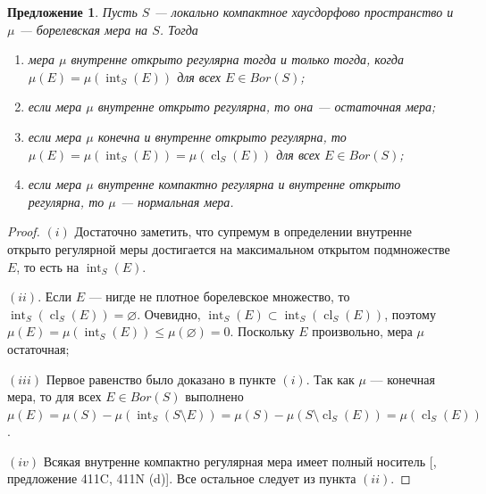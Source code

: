 \documentclass[12pt]{article}
\newtheorem{proposition}[theorem]{Предложение}
\begin{document}
\begin{proposition}\label{InnerOpenRegMeasCharac} Пусть $S$ --- локально
    компактное хаусдорфово пространство и $\mu$ --- борелевская мера на $S$.
    Тогда

    \begin{enumerate}[label = (\roman*)]
        \item мера $\mu$ внутренне открыто регулярна тогда и только тогда, когда
              $\mu(E)=\mu(\operatorname{int}_S(E))$ для всех $E\in Bor(S)$;

        \item если мера $\mu$ внутренне открыто регулярна, то она 
              --- остаточная мера;

        \item если мера $\mu$ конечна и внутренне открыто регулярна, то
              $\mu(E)=\mu(\operatorname{int}_S(E))=\mu(\operatorname{cl}_S(E))$
              для всех $E\in Bor(S)$;

        \item если мера $\mu$ внутренне компактно регулярна и внутренне открыто 
              регулярна, то $\mu$ --- нормальная мера.
    \end{enumerate}
\end{proposition}
\begin{proof} $(i)$ Достаточно заметить, что супремум в определении внутренне
    открыто регулярной меры достигается на максимальном открытом подмножестве
    $E$, то есть на $\operatorname{int}_S(E)$.

    $(ii)$. Если $E$ --- нигде не плотное борелевское множество, 
    то $\operatorname{int}_S(\operatorname{cl}_S(E))=\varnothing$. 
    Очевидно, $\operatorname{int}_S(E)
        \subset\operatorname{int}_S(\operatorname{cl}_S(E))$, 
    поэтому $\mu(E)=\mu(\operatorname{int}_S(E))\leq\mu(\varnothing)=0$. 
    Поскольку $E$ произвольно, мера $\mu$ остаточная;

    $(iii)$ Первое равенство было доказано в пункте $(i)$. Так как $\mu$ ---
    конечная мера, то для всех $E\in Bor(S)$ выполнено
    $\mu(E)=\mu(S)-\mu(\operatorname{int}_S(S\setminus E))=\mu(S)-\mu(S\setminus
        \operatorname{cl}_S(E))=\mu(\operatorname{cl}_S(E))$.

    $(iv)$ Всякая внутренне компактно регулярная мера имеет полный носитель
    [\cite{FremMeasTh4.1}, предложение 411C, 411N (d)]. Все остальное следует из
    пункта $(ii)$.
\end{proof}
\end{document}

